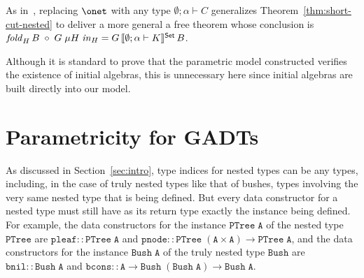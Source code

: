 \documentclass{lmcs}
\theoremstyle{plain}\newtheorem{satz}[thm]{Satz}
\begin{document}
\vspace*{0.05in}

As in~\cite{jg10}, replacing $\onet$ with any type $\emptyset;\alpha
\vdash C$ generalizes Theorem~\ref{thm:short-cut-nested} to deliver a
more general a free theorem whose conclusion is $\mathit{fold}_{H}\, B
\; \circ \; G\; \mu H \; \mathit{in}_{H} = G
\,\llbracket{\emptyset;\alpha \vdash K}\rrbracket^{\mathsf{Set}}\, B$.

\vspace*{0.05in}

Although it is standard to prove that the parametric model constructed
verifies the existence of initial algebras, this is unnecessary here
since initial algebras are built directly into our model.

\section{Parametricity for GADTs}\label{sec:GADTs}

As discussed in Section~\ref{sec:intro}, type indices for nested types
can be any types, including, in the case of truly nested types like
that of bushes, types involving the very same nested type that is
being defined. But every data constructor for a nested type must still
have as its return type exactly the instance being defined. For
example, the data constructors for the instance $\mathtt{PTree\; A}$ of the
nested type $\mathtt{PTree}$ are $\mathtt{pleaf :: PTree\; A}$ and
$\mathtt{pnode :: PTree\; (A \times A) \to PTree\; A}$, and
the data constructors for the instance $\mathtt{Bush \;A}$ of the truly
nested type $\mathtt{Bush}$ are $\mathtt{bnil :: Bush\; A}$ and
$\mathtt{bcons :: A \to Bush\; (Bush\; A) \to Bush\; A}$.
\end{document}
